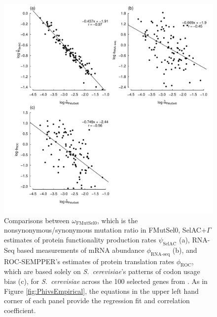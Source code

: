 \documentclass[12pt,letterpaper]{article}
\newcommand{\selac}{SelAC\xspace}
\newcommand{\selacplusgamma}{SelAC$+\Gamma$\xspace}
\newcommand{\psihat}{\ensuremath{\hat{\psi}_{\text{\selac}}}\xspace}
\begin{document}
\begin{figure}[H]
  \centering
  \includegraphics[width=0.9\linewidth]{FIGURE_2_MutSelOmega_vs_Us_ROC_Scer_only.pdf}
  \caption{Comparisons between $\omega_{\text{FMutSel0}}$, which is the nonsynonymous/synonymous mutation ratio in FMutSel0, \selacplusgamma estimates of protein functionality production rates $\psihat$ (a), RNA-Seq based measurements of mRNA abundance $\phi_{\text{RNA-seq}}$ (b), and ROC-SEMPPER's estimates of protein translation rates $\phi_{\text{ROC}}$, which are based solely on \emph{S.~cerevisiae}'s patterns of codon usage bias (c), for \emph{S.~cerevisiae} across the 100 selected genes from \citet{SalichosAndRokas2013}.
    As in Figure \ref{fig:PhivsEmpirical}, the equations in the upper left hand corner of each panel provide the regression fit and correlation coefficient.
}
  \label{fig:OmegavsPsi}
\end{figure}
\end{document}
